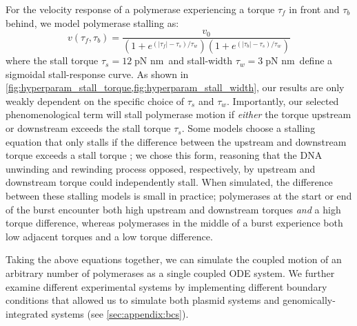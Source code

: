 \documentclass[11pt]{article}
\newcommand{\unit}[1]{\; \text{#1}\,}
\begin{document}
For the velocity response of a polymerase experiencing a torque \(\tau_f\) in front and \(\tau_b\) behind, we model polymerase stalling as:
\begin{equation}
    v(\tau_f, \tau_b) = \frac{v_0}{(1 + e^{(|\tau_f| - \tau_s)/\tau_w})(1 + e^{(|\tau_b| - \tau_s)/\tau_w})}
\label{eq:velocity_response}
\end{equation}
where the stall torque \(\tau_s = 12 \unit{pN nm}\) and stall-width \(\tau_w = 3 \unit{pN nm}\) define a sigmoidal stall-response curve.
As shown in \cref{fig:hyperparam_stall_torque,fig:hyperparam_stall_width}, our results are only weakly dependent on the specific choice of \(\tau_s\) and \(\tau_w\).
Importantly, our selected phenomenological term will stall polymerase motion if \emph{either} the torque upstream or downstream exceeds the stall torque \(\tau_s\). Some models choose a stalling equation that only stalls if the difference between the upstream and downstream torque exceeds a stall torque \parencite{tripathiDNASupercoilingmediatedCollective2021}; we chose this form, reasoning that the DNA unwinding and rewinding process opposed, respectively, by upstream and downstream torque could independently stall. When simulated, the difference between these stalling models is small in practice; polymerases at the start or end of the burst encounter both high upstream and downstream torques \emph{and} a high torque difference, whereas polymerases in the middle of a burst experience both low adjacent torques and a low torque difference.

Taking the above equations together, we can simulate the coupled motion of an arbitrary number of polymerases as a single coupled ODE system. We further examine different experimental systems by implementing different boundary conditions that allowed us to simulate both plasmid systems and genomically-integrated systems (see \cref{sec:appendix:bcs}).
\end{document}
